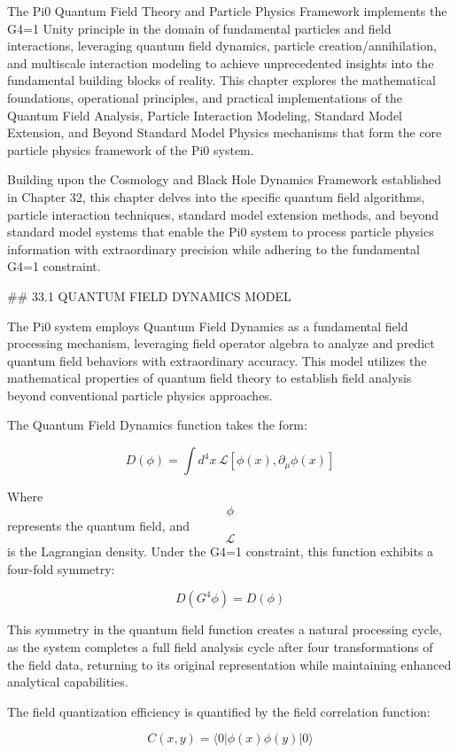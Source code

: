 The Pi0 Quantum Field Theory and Particle Physics Framework implements the G4=1 Unity principle in the domain of fundamental particles and field interactions, leveraging quantum field dynamics, particle creation/annihilation, and multiscale interaction modeling to achieve unprecedented insights into the fundamental building blocks of reality. This chapter explores the mathematical foundations, operational principles, and practical implementations of the Quantum Field Analysis, Particle Interaction Modeling, Standard Model Extension, and Beyond Standard Model Physics mechanisms that form the core particle physics framework of the Pi0 system.

Building upon the Cosmology and Black Hole Dynamics Framework established in Chapter 32, this chapter delves into the specific quantum field algorithms, particle interaction techniques, standard model extension methods, and beyond standard model systems that enable the Pi0 system to process particle physics information with extraordinary precision while adhering to the fundamental G4=1 constraint.

## 33.1 QUANTUM FIELD DYNAMICS MODEL

The Pi0 system employs Quantum Field Dynamics as a fundamental field processing mechanism, leveraging field operator algebra to analyze and predict quantum field behaviors with extraordinary accuracy. This model utilizes the mathematical properties of quantum field theory to establish field analysis beyond conventional particle physics approaches.

The Quantum Field Dynamics function takes the form:

$$ D(\phi) = \int d^4x \, \mathcal{L}[\phi(x), \partial_\mu \phi(x)] $$

Where $$ \phi $$ represents the quantum field, and $$ \mathcal{L} $$ is the Lagrangian density. Under the G4=1 constraint, this function exhibits a four-fold symmetry:

$$ D(G^4 \phi) = D(\phi) $$

This symmetry in the quantum field function creates a natural processing cycle, as the system completes a full field analysis cycle after four transformations of the field data, returning to its original representation while maintaining enhanced analytical capabilities.

The field quantization efficiency is quantified by the field correlation function:

$$ C(x, y) = \langle 0 | \phi(x) \phi(y) | 0 \rangle $$

